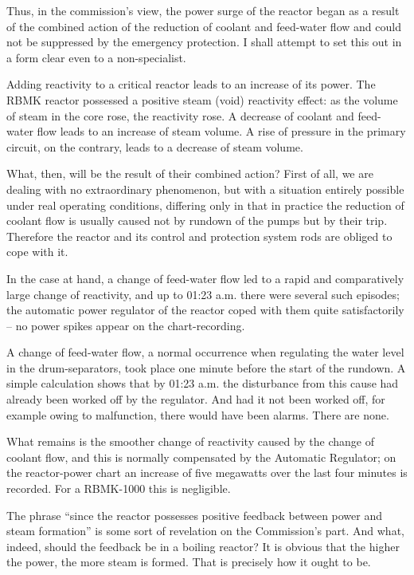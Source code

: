 \documentclass[openright]{bookest}
\begin{document}
Thus, in the commission's view, the power surge of the reactor began as a result of the combined action of the reduction of coolant and feed-water flow and could not be suppressed by the emergency protection. I shall attempt to set this out in a form clear even to a non-specialist.

Adding reactivity to a critical reactor leads to an increase of its power. The RBMK reactor possessed a positive steam (void) reactivity effect: as the volume of steam in the core rose, the reactivity rose. A decrease of coolant and feed-water flow leads to an increase of steam volume. A rise of pressure in the primary circuit, on the contrary, leads to a decrease of steam volume.

What, then, will be the result of their combined action? First of all, we are dealing with no extraordinary phenomenon, but with a situation entirely possible under real operating conditions, differing only in that in practice the reduction of coolant flow is usually caused not by rundown of the pumps but by their trip. Therefore the reactor and its control and protection system rods are obliged to cope with it.

In the case at hand, a change of feed-water flow led to a rapid and comparatively large change of reactivity, and up to 01:23 a.m. there were several such episodes; the automatic power regulator of the reactor coped with them quite satisfactorily -- no power spikes appear on the chart-recording.

A change of feed-water flow, a normal occurrence when regulating the water level in the drum-separators, took place one minute before the start of the rundown. A simple calculation shows that by 01:23 a.m. the disturbance from this cause had already been worked off by the regulator. And had it not been worked off, for example owing to malfunction, there would have been alarms. There are none.

What remains is the smoother change of reactivity caused by the change of coolant flow, and this is normally compensated by the Automatic Regulator; on the reactor-power chart an increase of five megawatts over the last four minutes is recorded. For a RBMK-1000 this is negligible.

The phrase ``since the reactor possesses positive feedback between power and steam formation'' is some sort of revelation on the Commission's part. And what, indeed, should the feedback be in a boiling reactor? It is obvious that the higher the power, the more steam is formed. That is precisely how it ought to be.
\end{document}
